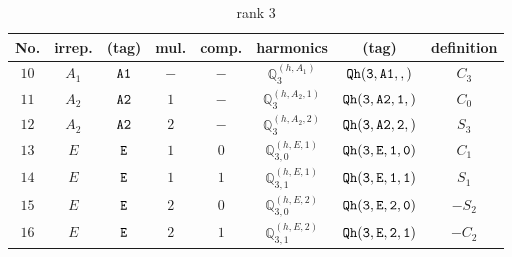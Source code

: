 \documentclass[fleqn,8pt]{jsarticle}
\begin{document}
\begin{table}[ht!]
\begin{center}
\caption{rank 3}
\renewcommand{\arraystretch}{1.3}
\begin{tabular}{cccccccc} \hline \hline
No. & irrep. & (tag) & mul. & comp. & harmonics & (tag) & definition \\ \hline
$ 10 $ & $ A_{1} $ & $ {\tt A1} $ & $ - $ & $ - $ & $ \mathbb{Q}_{3}^{(h,A_{1})} $ & $ {\tt Qh(3,A1,,)} $ & $ C_{3} $ \\
$ 11 $ & $ A_{2} $ & $ {\tt A2} $ & $ 1 $ & $ - $ & $ \mathbb{Q}_{3}^{(h,A_{2},1)} $ & $ {\tt Qh(3,A2,1,)} $ & $ C_{0} $ \\
$ 12 $ & $ A_{2} $ & $ {\tt A2} $ & $ 2 $ & $ - $ & $ \mathbb{Q}_{3}^{(h,A_{2},2)} $ & $ {\tt Qh(3,A2,2,)} $ & $ S_{3} $ \\
$ 13 $ & $ E $ & $ {\tt E} $ & $ 1 $ & $ 0 $ & $ \mathbb{Q}_{3,0}^{(h,E,1)} $ & $ {\tt Qh(3,E,1,0)} $ & $ C_{1} $ \\
$ 14 $ & $ E $ & $ {\tt E} $ & $ 1 $ & $ 1 $ & $ \mathbb{Q}_{3,1}^{(h,E,1)} $ & $ {\tt Qh(3,E,1,1)} $ & $ S_{1} $ \\
$ 15 $ & $ E $ & $ {\tt E} $ & $ 2 $ & $ 0 $ & $ \mathbb{Q}_{3,0}^{(h,E,2)} $ & $ {\tt Qh(3,E,2,0)} $ & $ - S_{2} $ \\
$ 16 $ & $ E $ & $ {\tt E} $ & $ 2 $ & $ 1 $ & $ \mathbb{Q}_{3,1}^{(h,E,2)} $ & $ {\tt Qh(3,E,2,1)} $ & $ - C_{2} $ \\
 \hline \hline
\end{tabular}
\end{center}
\end{table}
\end{document}
